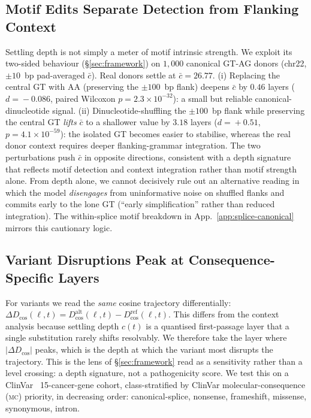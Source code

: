 \documentclass{article}
\theoremstyle{plain}
\theoremstyle{definition}
\theoremstyle{remark}
\newcommand{\Dcos}{D_{\cos}}
\newcommand{\DDcos}{\Delta D_{\cos}}
\begin{document}
\subsection{Motif Edits Separate Detection from Flanking Context}
\label{sec:motif-controls}

Settling depth is not simply a meter of motif intrinsic strength. We exploit its two-sided behaviour (\S\ref{sec:framework}) on $1{,}000$ canonical GT-AG donors (chr22, $\pm 10$~bp pad-averaged $\bar c$). Real donors settle at $\bar c\!=\!26.77$. (i) Replacing the central GT with AA (preserving the $\pm 100$~bp flank) deepens $\bar c$ by $0.46$ layers ($d\!=\!-0.086$, paired Wilcoxon $p\!=\!2.3\!\times\!10^{-32}$): a small but reliable canonical-dinucleotide signal. (ii) Dinucleotide-shuffling the $\pm 100$~bp flank while preserving the central GT \emph{lifts} $\bar c$ to a shallower value by $3.18$ layers ($d\!=\!+0.51$, $p\!=\!4.1\!\times\!10^{-59}$): the isolated GT becomes easier to stabilise, whereas the real donor context requires deeper flanking-grammar integration. The two perturbations push $\bar c$ in opposite directions, consistent with a depth signature that reflects motif detection and context integration rather than motif strength alone. From depth alone, we cannot decisively rule out an alternative reading in which the model \emph{disengages} from uninformative noise on shuffled flanks and commits early to the lone GT (``early simplification'' rather than reduced integration). The within-splice motif breakdown in App.~\ref{app:splice-canonical} mirrors this cautionary logic.

\subsection{Variant Disruptions Peak at Consequence-Specific Layers}
\label{sec:variant-disruption}

For variants we read the \emph{same} cosine trajectory differentially: $\DDcos(\ell,t)\!=\!\Dcos^{\mathrm{alt}}(\ell,t)-\Dcos^{\mathrm{ref}}(\ell,t)$. This differs from the context analysis because settling depth $c(t)$ is a quantised first-passage layer that a single substitution rarely shifts resolvably. We therefore take the layer where $|\DDcos|$ peaks, which is the depth at which the variant most disrupts the trajectory. This is the lens of \S\ref{sec:framework} read as a sensitivity rather than a level crossing: a depth signature, not a pathogenicity score. We test this on a ClinVar~\cite{landrum2020clinvar} 15-cancer-gene cohort, class-stratified by ClinVar molecular-consequence (\textsc{mc}) priority, in decreasing order: canonical-splice, nonsense, frameshift, missense, synonymous, intron.
\end{document}
